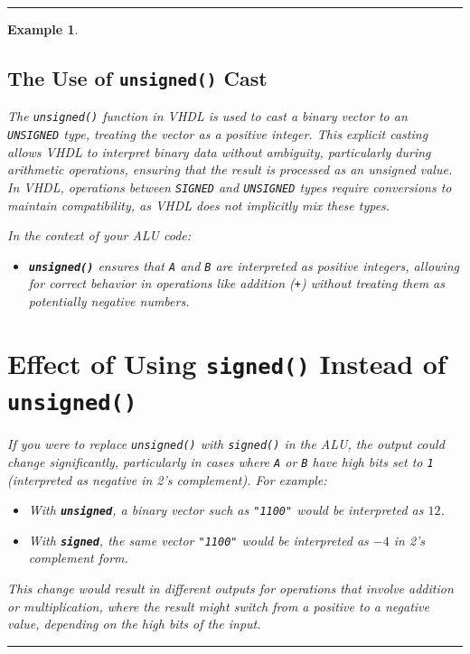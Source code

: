 \documentclass[12pt]{article}
\newtheorem{example}{Example}
\newenvironment{examp}
{
	\vspace{.5cm}
	\hrule
\begin{example}\upshape}
	{\hrule
		\vspace{0.5cm}
\end{example}}
\begin{document}
\begin{examp}
\vspace{.5mm}
\subsection*{The Use of \texttt{unsigned()} Cast}

The \texttt{unsigned()} function in VHDL is used to cast a binary vector to an \texttt{UNSIGNED} type, treating the vector as a positive integer. This explicit casting allows VHDL to interpret binary data without ambiguity, particularly during arithmetic operations, ensuring that the result is processed as an unsigned value. In VHDL, operations between \texttt{SIGNED} and \texttt{UNSIGNED} types require conversions to maintain compatibility, as VHDL does not implicitly mix these types.

In the context of your ALU code:
\begin{itemize}
	\item \textbf{\texttt{unsigned()}} ensures that \texttt{A} and \texttt{B} are interpreted as positive integers, allowing for correct behavior in operations like addition (\texttt{+}) without treating them as potentially negative numbers.
\end{itemize}

\section*{Effect of Using \texttt{signed()} Instead of \texttt{unsigned()}}

If you were to replace \texttt{unsigned()} with \texttt{signed()} in the ALU, the output could change significantly, particularly in cases where \texttt{A} or \texttt{B} have high bits set to \texttt{1} (interpreted as negative in 2’s complement). For example:
\begin{itemize}
	\item With \textbf{\texttt{unsigned}}, a binary vector such as \texttt{"1100"} would be interpreted as \(12\).
	\item With \textbf{\texttt{signed}}, the same vector \texttt{"1100"} would be interpreted as \(-4\) in 2's complement form.
\end{itemize}

This change would result in different outputs for operations that involve addition or multiplication, where the result might switch from a positive to a negative value, depending on the high bits of the input.


\end{examp}
\end{document}
